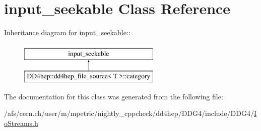 \hypertarget{classboost_1_1iostreams_1_1input__seekable}{
\section{input\_\-seekable Class Reference}
\label{classboost_1_1iostreams_1_1input__seekable}
}
Inheritance diagram for input\_\-seekable::\begin{figure}[H]
\begin{center}
\leavevmode
\includegraphics[height=2cm]{classboost_1_1iostreams_1_1input__seekable}
\end{center}
\end{figure}


The documentation for this class was generated from the following file:\begin{DoxyCompactItemize}
\item 
/afs/cern.ch/user/m/mpetric/nightly\_\-cppcheck/dd4hep/DDG4/include/DDG4/\hyperlink{_io_streams_8h}{IoStreams.h}\end{DoxyCompactItemize}
